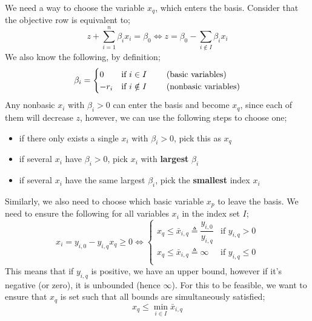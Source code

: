 \documentclass[a4paper, 12pt]{article}
\newcommand{\summation}[2]{\sum\limits_{#1}^{#2}}
\begin{document}
                We need a way to choose the variable $x_q$, which enters the basis.
                Consider that the objective row is equivalent to;
                $$z + \summation{i = 1}{n} \beta_i x_i = \beta_0 \Leftrightarrow z = \beta_0 - \summation{i \notin I}{} \beta_i x_i$$
                We also know the following, by definition;
                $$\beta_i = \begin{cases}
                    0 & \text{if } i \in I \text{\hspace{20pt} (basic variables)} \\
                    -r_i & \text{if } i \notin I \text{\hspace{20pt} (nonbasic variables)}
                \end{cases}$$
                Any nonbasic $x_i$ with $\beta_i > 0$ can enter the basis and become $x_q$, since each of them will decrease $z$, however, we can use the following steps to choose one;
                \begin{itemize}
                    \itemsep0em
                    \item if there only exists a single $x_i$ with $\beta_i > 0$, pick this as $x_q$
                    \item if several $x_i$ have $\beta_i > 0$, pick $x_i$ with \textbf{largest} $\beta_i$
                    \item if several $x_i$ have the same largest $\beta_i$, pick the \textbf{smallest} index $x_i$
                \end{itemize}
                Similarly, we also need to choose which basic variable $x_p$ to leave the basis.
                We need to ensure the following for all variables $x_i$ in the index set $I$;
                $$x_i = y_{i, 0} - y_{i, q} x_q \geq 0 \Leftrightarrow \begin{cases}
                    x_q \leq \bar{x}_{i, q} \triangleq \dfrac{y_{i, 0}}{y_{i, q}}& \text{if } y_{i, q} > 0 \\
                    x_q \leq \bar{x}_{i, q} \triangleq \infty & \text{if } y_{i, q} \leq 0 \\
                \end{cases}$$
                This means that if $y_{i, q}$ is positive, we have an upper bound, however if it's negative (or zero), it is unbounded (hence $\infty$).
                For this to be feasible, we want to ensure that $x_q$ is set such that all bounds are simultaneously satisfied;
                $$x_q \leq \min_{i \in I} \bar{x}_{i, q}$$
\end{document}
